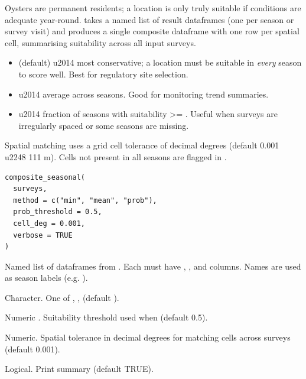 \documentclass[a4paper]{book}
\begin{document}
\begin{Description}
Oysters are permanent residents; a location is only truly suitable if
conditions are adequate year-round.  takes a named
list of  result dataframes (one per season or survey
visit) and produces a single composite dataframe with one row per spatial
cell, summarising suitability across all input surveys.

\begin{itemize}

\item{}  (default) \bsl{}u2014 most conservative; a location must be suitable in
\emph{every} season to score well. Best for regulatory site selection.
\item{}  \bsl{}u2014 average across seasons. Good for monitoring trend summaries.
\item{}  \bsl{}u2014 fraction of seasons with suitability >= .
Useful when surveys are irregularly spaced or some seasons are missing.

\end{itemize}


Spatial matching uses a grid cell tolerance of  decimal degrees
(default 0.001 \bsl{}u2248 111 m). Cells not present in all seasons are flagged in
.
\end{Description}
%
\begin{Usage}
\begin{verbatim}
composite_seasonal(
  surveys,
  method = c("min", "mean", "prob"),
  prob_threshold = 0.5,
  cell_deg = 0.001,
  verbose = TRUE
)
\end{verbatim}
\end{Usage}
%
\begin{Arguments}
\begin{ldescription}
\item[\code{surveys}] Named list of dataframes from . Each must
have , , and  columns. Names are used as season
labels (e.g. ).

\item[\code{method}] Character. One of , ,  (default ).

\item[\code{prob\_threshold}] Numeric . Suitability threshold used when
 (default 0.5).

\item[\code{cell\_deg}] Numeric. Spatial tolerance in decimal degrees for matching
cells across surveys (default 0.001).

\item[\code{verbose}] Logical. Print summary (default TRUE).
\end{ldescription}
\end{Arguments}
\end{document}
